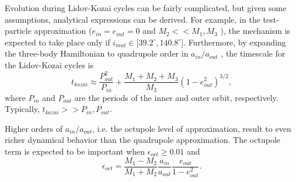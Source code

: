 Evolution during Lidov-Kozai cycles can be fairly complicated, but given some assumptions, analytical expressions can be derived. For example, in the test-particle approximation ($e_{in}=e_{out}=0$ and $M_2 << M_1, M_3$ \citep{naoz2013secular}), the mechanism is expected to take place only if $i_{mut} \in [39.2^{\circ},140.8^{\circ}$]. Furthermore, by expanding the three-body Hamiltonian to quadrupole order in $a_{in}/a_{out}$ \citep{kinoshita1999analytical}, the timescale for the Lidov-Kozai cycles is
\begin{equation}\label{eq:lidov_kozai_timescale}
    t_{kozai} \approx \frac{P_{out}^2}{P_{in}} + \frac{M_1 + M_2 +M_3}{M_3}(1-e_{out}^2)^{3/2},
\end{equation}
where $P_{in}$ and $P_{out}$ are the periods of the inner and outer orbit, respectively. Typically, $t_{kozai} >> P_{in},P_{out}$.

Higher orders of $a_{in}/a_{out}$, i.e. the octupole level of approximation, result to even richer dynamical behavior than the quadrupole approximation. The octupole term is expected to be important when $\epsilon_{oct} \geq 0.01$ \citep{naoz2011hot,shappee2013mass} and
\begin{equation}\label{eq:octupole_term}
    \epsilon_{oct} = \frac{M_1 - M_2}{M_1 + M_2} \frac{a_{in}}{a_{out}} \frac{e_{out}}{1-e_{out}^2}.
\end{equation}